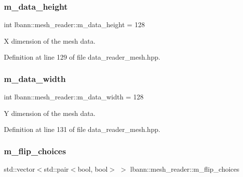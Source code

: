 \subsubsection{\texorpdfstring{m\+\_\+data\+\_\+height}{m\_data\_height}}
{\footnotesize\ttfamily int lbann\+::mesh\+\_\+reader\+::m\+\_\+data\+\_\+height = 128\hspace{0.3cm}{\ttfamily [protected]}}



X dimension of the mesh data. 



Definition at line 129 of file data\+\_\+reader\+\_\+mesh.\+hpp.

\mbox{\label{classlbann_1_1mesh__reader_a8e16a565b0afd3097a0b6fe31a94641e}} 
\subsubsection{\texorpdfstring{m\+\_\+data\+\_\+width}{m\_data\_width}}
{\footnotesize\ttfamily int lbann\+::mesh\+\_\+reader\+::m\+\_\+data\+\_\+width = 128\hspace{0.3cm}{\ttfamily [protected]}}



Y dimension of the mesh data. 



Definition at line 131 of file data\+\_\+reader\+\_\+mesh.\+hpp.

\mbox{\label{classlbann_1_1mesh__reader_aa9301a3dcaf08c03298f696e1430e67a}} 
\subsubsection{\texorpdfstring{m\+\_\+flip\+\_\+choices}{m\_flip\_choices}}
{\footnotesize\ttfamily std\+::vector$<$std\+::pair$<$bool, bool$>$ $>$ lbann\+::mesh\+\_\+reader\+::m\+\_\+flip\+\_\+choices\hspace{0.3cm}{\ttfamily [protected]}}

